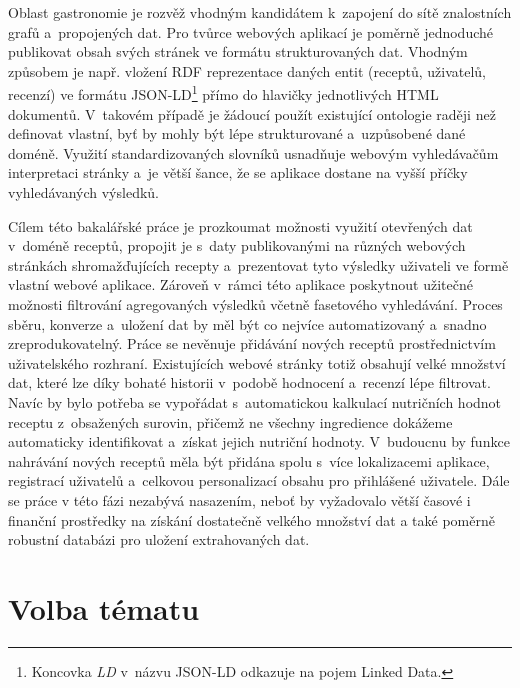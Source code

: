 Oblast gastronomie je rozvěž vhodným kandidátem k~zapojení do sítě znalostních grafů a~propojených dat. Pro tvůrce webových aplikací je poměrně jednoduché publikovat obsah svých stránek ve formátu strukturovaných dat. Vhodným způsobem je např. vložení RDF reprezentace daných entit (receptů, uživatelů, recenzí) ve formátu JSON-LD\footnote{Koncovka \emph{LD} v~názvu JSON-LD odkazuje na pojem Linked Data.} přímo do hlavičky jednotlivých HTML dokumentů. V~takovém případě je žádoucí použít existující ontologie raději než definovat vlastní, byť by mohly být lépe strukturované a~uzpůsobené dané doméně. Využití standardizovaných slovníků usnadňuje webovým vyhledávačům interpretaci stránky a~je větší šance, že se aplikace dostane na vyšší příčky vyhledávaných výsledků.

Cílem této bakalářské práce je prozkoumat možnosti využití otevřených dat v~doméně receptů, propojit je s~daty publikovanými na různých webových stránkách shromažďujících recepty a~prezentovat tyto výsledky uživateli ve formě vlastní webové aplikace. Zároveň v~rámci této aplikace poskytnout užitečné možnosti filtrování agregovaných výsledků včetně fasetového vyhledávání. Proces sbě\-ru, konverze a~uložení dat by měl být co nejvíce automatizovaný a~snadno zreprodukovatelný. Práce se nevěnuje přidávání nových receptů prostřednictvím uživatelského rozhraní. Existujících webové stránky totiž obsahují velké množství dat, které lze díky bohaté historii v~podobě hodnocení a~recenzí lépe filtrovat. Navíc by bylo potřeba se vypořádat s~automatickou kalkulací nutričních hodnot receptu z~obsažených surovin, přičemž ne všechny ingredience dokážeme automaticky identifikovat a~získat jejich nutriční hodnoty. V~budoucnu by funkce nahrávání nových receptů měla být přidána spolu s~více lokalizacemi aplikace, registrací uživatelů a~celkovou personalizací obsahu pro přihlášené uživatele. Dále se práce v této fázi nezabývá nasazením, neboť by vyžadovalo větší časové i finanční prostředky na získání dostatečně velkého množství dat a také poměrně robustní databázi pro uložení extrahovaných dat. 

\section*{Volba tématu}
\setcounter{tocdepth}{1}


